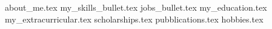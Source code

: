 \documentclass[10pt, a4paper]{awesome-cv2}
\newcommand*{\sectiondir}{cv/}
\begin{document}
\makecvheader[R]

{about_me.tex}
{my_skills_bullet.tex}
{jobs_bullet.tex}
{my_education.tex}
{my_extracurricular.tex}
{scholarships.tex}
{pubblications.tex}
{hobbies.tex}
\end{document}
